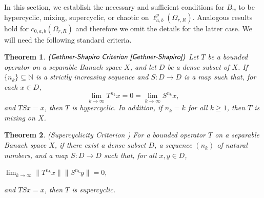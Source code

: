\documentclass[12pt, reqno]{amsart}
\newtheorem{theorem}{Theorem}[section]
\theoremstyle{definition}
\theoremstyle{remark}
\numberwithin{equation}{section}
\begin{document}
In this section, we establish the necessary and sufficient conditions for 
\(B_w\) to be hypercyclic, mixing, supercyclic, or chaotic 
on \(\ell^{p}_{a,b}(\Omega_{r,R})\). Analogous results hold for \(c_{0,a,b}(\Omega_{r,R})\) and therefore we omit the details for the latter case. We will need the following standard criteria.

\begin{theorem}\label{thm-hypc} $\emph{\textsf{(Gethner-Shapiro Criterion~\cite{Gethner-Shapiro})}}$
Let $T$ be a bounded operator on a separable Banach space $X$, and let $D$ be a dense subset of $X$. If $\{n_k\} \subseteq \mathbb{N}$ is a strictly
increasing sequence and $S:D\rightarrow D$ is a map such that, for each
$x\in D$, 
\[
\lim_{k\rightarrow \infty} T^{n_k}x=0=\lim_{k\rightarrow \infty}S^{n_k}x,
\]
and $TSx=x$, then $T$ is hypercyclic. In addition, if $n_k=k$ for all $k\geq 1$, then $T$ is mixing on $X$.
\end{theorem}

\begin{theorem} \emph{\textsf{(Supercyclicity Criterion \cite{Montes1})}}
For a bounded operator $T$ on a separable Banach space $X$, if there exist a dense subset $D$, a sequence $(n_k)$ of natural numbers, and a map $S:D\rightarrow D$ such that, for all $x,y\in D$,  
\begin{center}
$\lim_{k\rightarrow \infty}\|T^{n_k}x\|\|S^{n_k}y\|=0,$
\end{center}
and $TSx=x$, then $T$ is supercyclic.
\end{theorem}
\end{document}
